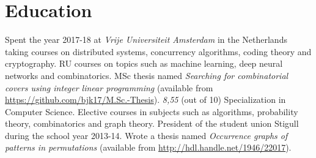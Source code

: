 \documentclass[11pt,a4paper,sans]{moderncv}
\begin{document}
\section{Education}
{}{Spent the year 2017-18 at \emph{Vrije Universiteit Amsterdam} in the
Netherlands taking courses on distributed systems, concurrency algorithms, coding
theory and cryptography. RU courses on topics such as machine learning, deep
neural networks and combinatorics. MSc thesis named \emph{Searching for
combinatorial covers using integer linear programming} (available from
\url{https://github.com/bjk17/M.Sc.-Thesis}).}
{\textit{8,55} (out of 10)} {Specialization in Computer Science. Elective courses
in subjects such as algorithms, probability theory, combinatorics and graph theory.
President of the student union Stigull during the school year 2013-14. Wrote a
thesis named \emph{Occurrence graphs of patterns in permutations} (available from
\url{http://hdl.handle.net/1946/22017}).}

\end{document}
